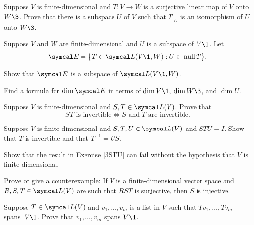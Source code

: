 \begin{exercises}

\exercise
Suppose $V$ is finite-dimensional and $T \colon V \to W$ is a surjective linear map of $V$ onto $W\3$.  Prove that there is a subspace $U$ of $V$ such that $T|_U$ is an isomorphism of $U$ onto $W\3$.


\exercise
Suppose $V$ and $W$ are finite-dimensional and $U$ is a subspace of $V\1$. Let
\[ \addtolength{\belowdisplayskip}{-3bp}
\E = \br[\big]{ T \in \L(V\1, W): U \subset \ker T}.
\]
\begin{subtheorem}
\item
Show that $\E$ is a subspace of $\L(V\1, W)$.
\item
Find a formula for $\dim \E$ in terms of $\dim V\1$, $\dim W\3$, and $\dim U$.
\end{subtheorem}


\exercise
Suppose $V$ is finite-dimensional and $S, T \in \L(V)$.  Prove that \label{379}
\[
ST \text{ is invertible} \iff S \text{ and } T \text{ are invertible}.
\]
\exercisedisplayend


\exercise
Suppose $V$ is finite-dimensional and $S, T, U \in \L(V)$ and
$
STU = I$.
Show that $T$ is invertible and that $T^{-1} = US$.\label{3STU}


\exercise
Show that the result in Exercise \ref{3STU} can fail without the hypothesis that $V$ is finite-dimensional.


\exercise
Prove or give a counterexample: If $V$ is a finite-dimensional vector space and $R, S, T \in
\L(V)$ are such that $RST$ is surjective, then $S$ is  injective.


\exercise
Suppose $T \in \L(V)$ and $v_1, \dots, v_m$ is a list in $V$ such that $Tv_1, \dots, Tv_m$ spans~$V\1$. Prove that
$v_1, \dots, v_m$ spans $V\1$.

\end{exercises}
